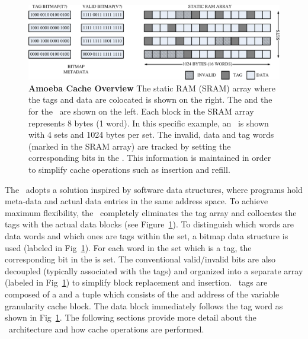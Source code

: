 \begin{figure}[h]
  \begin{center}
    \includegraphics[width=\textwidth]{files/Figures/06-AmoebaCacheArch.pdf}
    \caption[Amoeba Cache Overview]{\textbf{Amoeba Cache Overview} The static RAM (SRAM) array where the tags and data are colocated is shown on the right. The  and the  for the \AC\ are shown on the left. Each block in the SRAM array represents 8 bytes (1 word). In this specific example, an \AC\ is shown with 4 sets and 1024 bytes per set. The invalid, data and tag words (marked in the SRAM array) are tracked by setting the corresponding bits in the . This information is maintained in order to simplify cache operations such as insertion and refill. }
    \label{fig:amoeba_cache_arch}
  \end{center}
\end{figure}

The \AC\ adopts a solution inspired by software data structures, where programs hold meta-data and actual data entries in the same address space. To achieve maximum flexibility, the \AC\ completely eliminates the tag array and collocates the tags with the actual data blocks (see Figure~\ref{fig:amoeba_cache_arch}). To distinguish which words are data words and which ones are tags within the set, a bitmap data structure is used (labeled  in Fig~\ref{fig:amoeba_cache_arch}). For each word in the set which is a tag, the corresponding bit in the  is set. The conventional valid/invalid bits are also decoupled (typically associated with the tags) and organized into a separate array (labeled  in Fig~\ref{fig:amoeba_cache_arch}) to simplify block replacement and insertion. \AC\ tags are composed of a  and a tuple which consists of the  and  address of the variable granularity cache block. The data block immediately follows the tag word as shown in Fig~\ref{fig:amoeba_cache_arch}. The following sections provide more detail about the \AC\ architecture and how cache operations are performed.


